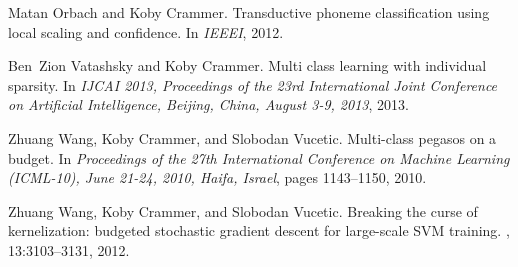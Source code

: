 \documentclass[12pt]{article}
\begin{document}
\begin{small}
\begin{thebibliography}{10}
Matan Orbach and Koby Crammer.
\newblock Transductive phoneme classification using local scaling and
confidence.
\newblock In {\em IEEEI}, 2012.

Ben~Zion Vatashsky and Koby Crammer.
\newblock Multi class learning with individual sparsity.
\newblock In {\em {IJCAI} 2013, Proceedings of the 23rd International Joint
	Conference on Artificial Intelligence, Beijing, China, August 3-9, 2013},
2013.

Zhuang Wang, Koby Crammer, and Slobodan Vucetic.
\newblock Multi-class pegasos on a budget.
\newblock In {\em Proceedings of the 27th International Conference on Machine
	Learning (ICML-10), June 21-24, 2010, Haifa, Israel}, pages 1143--1150, 2010.

Zhuang Wang, Koby Crammer, and Slobodan Vucetic.
\newblock Breaking the curse of kernelization: budgeted stochastic gradient
descent for large-scale {SVM} training.
, 13:3103--3131, 2012.

\end{thebibliography}

\end{small}
%
% 


\label{maxSeitenzahl}
\end{document}
